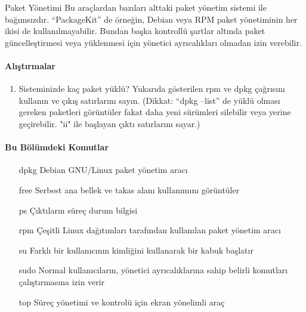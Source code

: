 \begin{section}{Paket Yönetimi}
Bu araçlardan bazıları alttaki paket yönetim sistemi ile bağımsızdır. “PackageKit” de örneğin, Debian veya RPM paket yönetiminin her ikisi de kullanılmayabilir. Bundan başka kontrollü şartlar altında paket güncelleştirmesi veya yüklenmesi için yönetici ayrıcalıkları olmadan izin verebilir.

\paragraph{{\Huge{\PencilLeftDown}}Alıştırmalar}{
\begin{enumerate}
\item Sisteminizde kaç paket yüklü? Yukarıda gösterilen rpm ve dpkg çağrısını kullanın ve çıkış satırlarını sayın. (Dikkat: “dpkg --list” de yüklü olması gereken paketleri görüntüler fakat daha yeni sürümleri silebilir veya yerine geçirebilir. "ii" ile başlayan çıktı satırlarını sayar.)
\end{enumerate}}

\paragraph{Bu Bölümdeki Komutlar}{
\begin{itemize}
\item[dpkg]Debian GNU/Linux paket yönetim aracı
\item[free]Serbest ana bellek ve takas alanı kullanımını görüntüler
\item[ps]Çıktıların süreç durum bilgisi
\item[rpm]Çeşitli Linux dağıtımları tarafından kullanılan paket yönetim aracı
\item[su]Farklı bir kullanıcının kimliğini kullanarak bir kabuk başlatır
\item[sudo]Normal kullanıcıların, yönetici ayrıcalıklarına sahip belirli komutları çalıştırmasına izin verir
\item[top]Süreç yönetimi ve kontrolü için ekran yönelimli araç
\end{itemize}}


\end{section}
